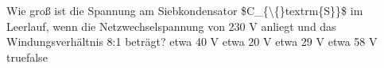     {Wie groß ist die Spannung am Siebkondensator \$C\_\{\textbackslash\{\}textrm\{S\}\}\$ im Leerlauf, wenn die Netzwechselspannung von 230 V anliegt und das Windungsverhältnis 8:1 beträgt?}
    {etwa 40 V}
    {etwa 20 V}
    {etwa 29 V}
    {etwa 58 V}
    {true}{false}